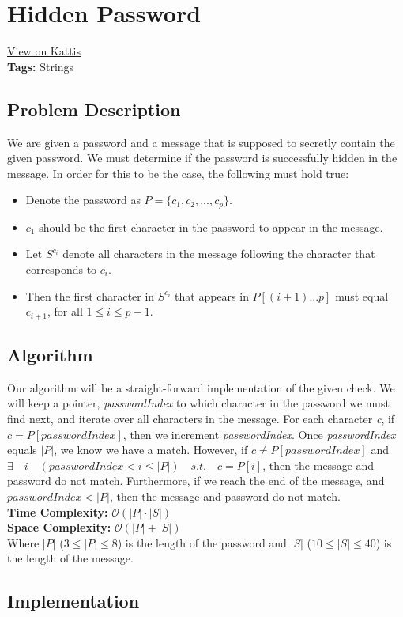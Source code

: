 \section{Hidden Password}
\label{hiddenpassword}
\href{https://open.kattis.com/problems/hidden}{View on Kattis}\\
\textbf{Tags:} Strings\\
\subsection{Problem Description}
We are given a password and a message that is supposed to secretly contain the
given password. We must determine if the password is successfully hidden in the
message. In order for this to be the case, the following must hold true:
\begin{itemize}
  \item Denote the password as $P = \{c_{1}, c_{2}, ..., c_{p}\}$.
  \item $c_{1}$ should be the first character in the password to appear in the
  message.
  \item Let $S^{c_{i}}$ denote all characters in the message following the
  character that corresponds to $c_{i}$.
  \item Then the first character in $S^{c_{i}}$ that appears in $P[(i+1) ... p]$
  must equal $c_{i+1}$, for all $ 1 \leq i \leq p-1$.
\end{itemize}
\subsection{Algorithm}
Our algorithm will be a straight-forward implementation of the given check. We
will keep a pointer, \textit{passwordIndex} to which character in the password
we must find next, and iterate over all characters in the message. For each
character \textit{c}, if $c = P[passwordIndex]$, then we increment
\textit{passwordIndex}. Once \textit{passwordIndex} equals $|P|$, we know we
have a match. However, if $c \neq P[passwordIndex]$ and
$\exists \quad i \quad (passwordIndex < i \leq |P|) \quad s.t. \quad c = P[i]$,
then the message and password do not match. Furthermore, if we reach the end of the
message, and $passwordIndex < |P|$, then the message and password do not match.\\
\hfill\break
\textbf{Time Complexity:} $\mathcal{O}(|P| \cdot |S|)$\\
\textbf{Space Complexity:} $\mathcal{O}(|P| + |S|)$\\
Where $|P|$ ($3 \leq |P| \leq 8$) is the length of the password and
$|S|$ ($10 \leq |S| \leq 40$) is the length of the message.
\pagebreak
\subsection{Implementation}

\pagebreak
